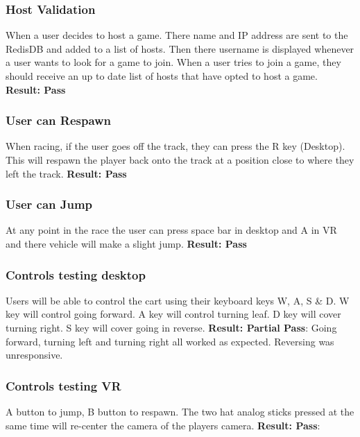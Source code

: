 \subsubsection{Host Validation}\newline
When a user decides to host a game. There name and IP address are sent to the RedisDB and added to a list of hosts. Then there username is displayed whenever a user wants to look for a game to join. When a user tries to join a game, they should receive an up to date list of hosts that have opted to host a game.\newline
\textbf{Result: Pass}

\subsubsection{User can Respawn}\newline
When racing, if the user goes off the track, they can press the R key (Desktop). This will respawn the player back onto the track at a position close to where they left the track. \newline 
\textbf{Result: Pass}

\subsubsection{User can Jump}\newline
At any point in the race the user can press space bar in desktop and A in VR and there vehicle will make a slight jump. \newline 
\textbf{Result: Pass}

\subsubsection{Controls testing desktop}\newline
Users will be able to control the cart using their keyboard keys W, A, S & D. W key will control going forward. A key will control turning leaf. D key will cover turning right. S key will cover going in reverse. \newline
\textbf{Result: Partial Pass}: Going forward, turning left and turning right all worked as expected. Reversing was unresponsive. 

\subsubsection{Controls testing VR}\newline
A button to jump, B button to respawn. The two hat analog sticks pressed at the same time will re-center the camera of the players camera.\newline  
\textbf{Result: Pass}:

